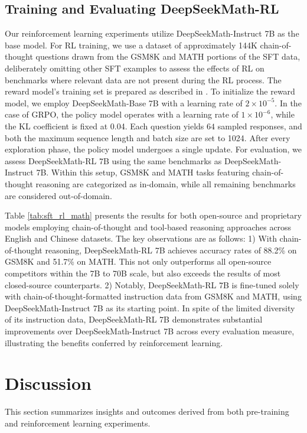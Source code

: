 \begin{itemize}[topsep=0pt]
\subsection{Training and Evaluating DeepSeekMath-RL}

Our reinforcement learning experiments utilize DeepSeekMath-Instruct 7B as the base model. For RL training, we use a dataset of approximately 144K chain-of-thought questions drawn from the GSM8K and MATH portions of the SFT data, deliberately omitting other SFT examples to assess the effects of RL on benchmarks where relevant data are not present during the RL process. The reward model's training set is prepared as described in \citep{wang2023math}. To initialize the reward model, we employ DeepSeekMath-Base 7B with a learning rate of $2 \times 10^{-5}$. In the case of GRPO, the policy model operates with a learning rate of $1 \times 10^{-6}$, while the KL coefficient is fixed at 0.04. Each question yields $64$ sampled responses, and both the maximum sequence length and batch size are set to 1024. After every exploration phase, the policy model undergoes a single update. For evaluation, we assess DeepSeekMath-RL 7B using the same benchmarks as DeepSeekMath-Instruct 7B. Within this setup, GSM8K and MATH tasks featuring chain-of-thought reasoning are categorized as in-domain, while all remaining benchmarks are considered out-of-domain.

Table \ref{tab:sft_rl_math} presents the results for both open-source and proprietary models employing chain-of-thought and tool-based reasoning approaches across English and Chinese datasets. The key observations are as follows: 1) With chain-of-thought reasoning, DeepSeekMath-RL 7B achieves accuracy rates of 88.2\% on GSM8K and 51.7\% on MATH. This not only outperforms all open-source competitors within the 7B to 70B scale, but also exceeds the results of most closed-source counterparts. 2) Notably, DeepSeekMath-RL 7B is fine-tuned solely with chain-of-thought-formatted instruction data from GSM8K and MATH, using DeepSeekMath-Instruct 7B as its starting point. In spite of the limited diversity of its instruction data, DeepSeekMath-RL 7B demonstrates substantial improvements over DeepSeekMath-Instruct 7B across every evaluation measure, illustrating the benefits conferred by reinforcement learning.

\section{Discussion}
This section summarizes insights and outcomes derived from both pre-training and reinforcement learning experiments.


\end{itemize}

